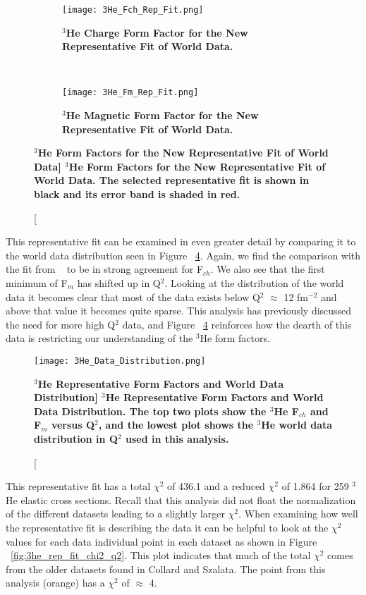 \begin{figure}[!ht]
\begin{subfigure}{1.\textwidth}
  \centering
  \texttt{[image: 3He\_Fch\_Rep\_Fit.png]}
  \caption{\bf{$^3$He Charge Form Factor for the New Representative Fit of World Data.}}
  \label{fig:3he_fch_rep_fit}
\end{subfigure}\\
\begin{subfigure}{1.\textwidth}
  \centering
  \texttt{[image: 3He\_Fm\_Rep\_Fit.png]}
  \caption{\bf{$^3$He Magnetic Form Factor for the New Representative Fit of World Data.}}
  \label{fig:3he_fm_rep_fit}
\end{subfigure}
\caption[\bf{$^3$He Form Factors for the New Representative Fit of World Data}] {
{\bf{$^3$He Form Factors for the New Representative Fit of World Data.}} The selected representative fit is shown in black and its error band is shaded in red.}
\label{fig:3he_rep_fit}
\end{figure}

This representative fit can be examined in even greater detail by comparing it to the world data distribution seen in Figure ~\ref{fig:3he_data_distribution}. Again, we find the comparison with the fit from ~\cite{Article:Amroun} to be in strong agreement for F$_{ch}$. We also see that the first minimum of F$_m$ has shifted up in Q$^2$. Looking at the distribution of the world data it becomes clear that most of the data exists below Q$^2$ $\approx$ 12 fm$^{-2}$ and above that value it becomes quite sparse. This analysis has previously discussed the need for more high Q$^2$ data, and Figure ~\ref{fig:3he_data_distribution} reinforces how the dearth of this data is restricting our understanding of the $^3$He form factors.

\begin{figure}[!ht]
	\begin{center}
	\texttt{[image: 3He\_Data\_Distribution.png]}
	\end{center}
	\caption[\bf{$^3$He Representative Form Factors and World Data Distribution}]{
	{\bf{$^3$He Representative Form Factors and World Data Distribution.}} The top two plots show the $^3$He F$_{ch}$ and F$_m$ versus Q$^2$, and the lowest plot shows the $^3$He world data distribution in Q$^2$ used in this analysis.}
	\label{fig:3he_data_distribution}
\end{figure}

This representative fit has a total $\chi^2$ of 436.1 and a reduced $\chi^2$ of 1.864 for 259 $^3$He elastic cross sections. Recall that this analysis did not float the normalization of the different datasets leading to a slightly larger $\chi^2$. When examining how well the representative fit is describing the data it can be helpful to look at the $\chi^2$ values for each data individual point in each dataset as shown in Figure ~\ref{fig:3he_rep_fit_chi2_q2}. This plot indicates that much of the total $\chi^2$ comes from the older datasets found in Collard and Szalata. The point from this analysis (orange) has a $\chi^2$ of $\approx$ 4. 

